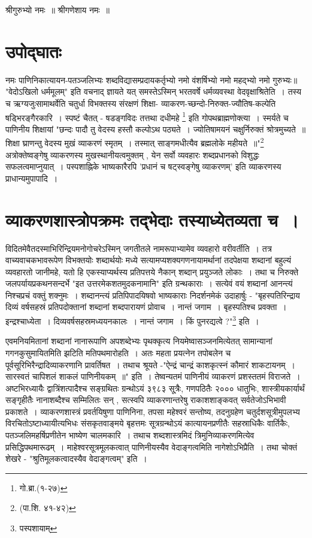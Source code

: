 \tableofcontents
\newpage
श्रीगुरुभ्यो नमः~॥ \hfill                                                      श्रीगणेशाय नमः~॥
\section*{\LARGE\centering उपोद्घातः}
नमः पाणिनिकात्यायन-पतञ्जलिभ्यः शब्दविद्यासम्प्रदायकर्तृभ्यो
नमो वंशर्षिभ्यो नमो महद्भ्यो नमो गुरुभ्यः॥
"वेदोऽखिलो धर्ममूलम्" इति वचनाद् ज्ञायते यत् समस्तेऽस्मिन् भरतवर्षे धर्मव्यवस्था वेदवृक्षाश्रितेति~। तस्य च ऋग्यजुःसामाथर्वेति चतुर्धा विभक्तस्य संरक्षणं शिक्षा- व्याकरण-च्छन्दो-निरुक्त-ज्यौतिष-कल्पेति षड्भिरङ्गैरकारि~। स्पष्टं चैतत् - षडङ्गविदः तत्तथा दधीमहे \footnote{गो.ब्रा.(१-२७)} इति गोपथब्राह्मणोक्त्या~। स्मर्यते च पाणिनीय शिक्षायां "छन्दः पादौ तु वेदस्य हस्तौ कल्पोऽथ पठ्यते~। ज्योतिषामयनं चक्षुर्निरुक्तं श्रोत्रमुच्यते~॥ शिक्षा घ्राणन्तु वेदस्य मुखं व्याकरणं स्मृतम्~। तस्मात् साङ्गमधीत्यैव ब्रह्मलोके महीयते~॥"\footnote{(पा.शि. ४१-४२)}
अत्रोक्तेष्वङ्गेषु व्याकरणस्य मुखस्थानीयत्वमुक्तम् , येन सर्वो व्यवहारः शब्दप्रधानको विशुद्धः सफलत्वमाप्नुयात्~। पस्पशाह्निके भाष्यकारैरपि 'प्रधानं च षट्स्वङ्गेषु व्याकरणम्' इति व्याकरणस्य प्राधान्यमुपापादि~।

\section*{व्याकरणशास्त्रोपक्रमः तद्भेदाः तस्याध्येतव्यता च~।}
विदितमेवैतदस्माभिरिन्द्रियमनोगोचरेऽस्मिन् जगतीतले नामरूपाभ्यामेव व्यवहारो वरीवर्तीति~। तत्र वाच्यवाचकभावरूपेण विभक्तयोः शब्दार्थयोः मध्ये सत्यामप्यशक्यगणनायामर्थानां तदपेक्षया शब्दानां बहुल्यं व्यवहारतो जानीमहे, यतो हि एकस्याप्यर्थस्य प्रतिपत्तये नैकान् शब्दान् प्रयुञ्जते लोकाः~। तथा च निरुक्ते जलपर्यायप्रकथनसन्दर्भे "इत उत्तरमेकशतमुदकनामानि" इति ग्रन्थकाराः~। सत्येवं वयं शब्दानां आनन्त्यं निश्चप्रचं वक्तुं शक्नुमः~। शब्दानन्त्यं प्रतिपिपादयिषवो भाष्यकाराः निदर्शनमेकं उदाहार्षुः -
"बृहस्पतिरिन्द्राय दिव्यं वर्षसहस्रं प्रतिपदोक्तानां शब्दानां शब्दपारायणं प्रोवाच~। नान्तं जगाम~। बृहस्पतिश्च प्रवक्ता~। इन्द्रश्चाध्येता~। दिव्यवर्षसहस्रमध्ययनकालः~। नान्तं जगाम~। किं पुनरद्यत्वे ?"\footnote{पस्पशायाम्} इति~।

एवमनियमितानां शब्दानां नानारूपाणि अपशब्देभ्यः पृथक्कृत्य नियमेष्वासञ्जनमित्येतत् सामान्यानां गगनकुसुमायितमिति झटिति मतिपथमारोहति~। अतः महता प्रयत्नेन तपोबलेन च पूर्वसूरिभिरैन्द्रादिव्याकरणानि प्रावर्तिषत~। तथाच श्रूयते -"ऐन्द्रं चान्द्रं काशकृत्स्नं कौमारं शाकटायनम्~। सारस्वतं चापिशलं शाकलं पाणिनीयकम्~॥" इति~। तेष्वन्यतमं पाणिनीयं व्याकरणं प्रशस्ततमं विराजते~। अष्टभिरध्यायैः द्वात्रिंशत्पादैश्च सङ्ग्रथितः ग्रन्थोऽयं ३९८३ सू्त्रैः, गणपठितैः २००० धातुभिः, शास्त्रीयकार्यार्थं सङ्गृहीतैः नानाशब्दैश्च सम्मिलितः सन् , सत्स्वपि व्याकरणान्तरेषु राकाशशाङ्कवत् सर्वतेजोऽभिभावी प्रकाशते~। व्याकरणशास्त्रं प्रवर्तयिषुणा पाणिनिना, तपसा महेश्वरं सन्तोष्य, तदनुग्रहेण चतुर्दशसूत्रीमुपलभ्य विरचितोऽष्टाध्यायीत्यभिधः संसकृतवाङ्मये बृहत्तमः सूत्रग्रन्थोऽयं कात्यायनप्रणीतैः सहस्राधिकैः वार्तिकैः, पतञ्जलिमहर्षिप्रणीतेन भाष्येण चालमकारि~। तथाच शब्दशास्त्रमिदं त्रिमुनिव्याकरणमित्येव प्रसिद्धिपथमारूढम्~। माहेश्वरसूत्रमूलकत्वात् पाणिनीयस्यैव वेदाङ्गत्वमिति नागेशोऽभिप्रैति~। तथा चोक्तं शेखरे - "श्रुतिमूलकत्वादस्यैव वेदाङ्गत्वम्" इति~। 

